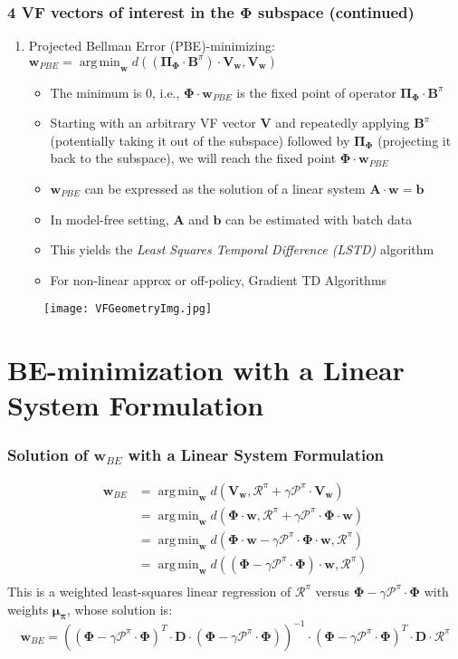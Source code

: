 \documentclass[handout]{beamer}
\newcommand{\vw}{\bm{V_w}}
\newcommand{\bphi}{\bm{\Phi}}
\newcommand{\bb}{\bm{B}^{\pi}}
\newcommand{\bpi}{\bm{\Pi_{\Phi}}}
\newcommand{\bmu}{\bm{\mu_{\pi}}}
\newcommand{\bv}{\bm{V}}
\newcommand{\bd}{\bm{D}}
\newcommand{\bw}{\bm{w}}
\newcommand{\brew}{\bm{\mathcal{R}}^{\pi}}
\newcommand{\bprob}{\bm{\mathcal{P}}^{\pi}}
\DeclareMathOperator*{\argmin}{arg\,min}
\newcounter{sauvegardeenumi}
\newcommand{\suite}{\setcounter{enumi}{\thesauvegardeenumi}}
\begin{document}
\begin{frame}
\frametitle{4 VF vectors of interest in the $\bphi$ subspace (continued)}
\begin{enumerate}

\suite

\item Projected Bellman Error (PBE)-minimizing: $\bm{w}_{PBE} = \argmin_{\bw} d((\bpi \cdot \bb) \cdot \vw, \vw)$
\pause
\begin{itemize}[<+->]
\item The minimum is 0, i.e., $\bphi \cdot \bm{w}_{PBE}$ is the fixed point of operator $\bpi \cdot \bb$
\item Starting with an arbitrary VF vector $\bv$ and repeatedly applying $\bb$ (potentially taking it out of the subspace) followed by $\bpi$ (projecting it back to the subspace), we will reach the fixed point $\bphi \cdot \bm{w}_{PBE}$
\item $\bm{w}_{PBE}$ can be expressed as the solution of a linear system $\bm{A} \cdot \bw = \bm{b}$
\item In model-free setting, $\bm{A}$ and $\bm{b}$ can be estimated with batch data
\item This yields the {\em Least Squares Temporal Difference (LSTD)} algorithm
\item For non-linear approx or off-policy, Gradient TD Algorithms
\end{itemize}

\end{enumerate}
\end{frame}

\begin{frame}
\begin{figure}
\texttt{[image: VFGeometryImg.jpg]}
\end{figure}
\end{frame}


\section{BE-minimization with a Linear System Formulation}

\begin{frame}
\frametitle{Solution of $\bm{w}_{BE}$ with a Linear System Formulation}
\pause
\begin{align*}
\bm{w}_{BE} & = \argmin_{\bw} d(\vw, \brew + \gamma \bprob \cdot \vw) \\
& = \argmin_{\bw} d(\bphi \cdot \bw, \brew + \gamma \bprob \cdot \bphi \cdot \bw)\\
& = \argmin_{\bw} d(\bphi \cdot \bw - \gamma \bprob \cdot \bphi \cdot \bw, \brew)\\
& = \argmin_{\bw} d((\bphi - \gamma \bprob \cdot \bphi) \cdot \bw, \brew )\\
\end{align*}
\pause
This is a weighted least-squares linear regression of $\brew$ versus $\bphi - \gamma \bprob \cdot \bphi$
with weights $\bmu$, whose solution is:
\pause
$$\bm{w}_{BE} = ((\bphi - \gamma \bprob \cdot \bphi)^T \cdot \bd \cdot (\bphi - \gamma \bprob \cdot \bphi))^{-1} \cdot (\bphi - \gamma \bprob \cdot \bphi)^T \cdot \bd \cdot \brew$$
\end{frame}
\end{document}
